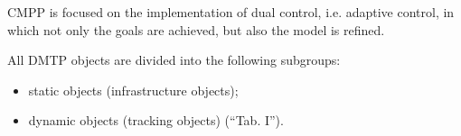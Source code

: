 \documentclass{article}
\begin{document}
\begin{multicols}{2}
CMPP is focused on the implementation of dual control, i.e. adaptive control, in which not only the goals are
achieved, but also the model is refined.

 All DMTP objects are divided into the following subgroups:
 \begin{itemize}
    \item static objects (infrastructure objects);
    \item dynamic objects (tracking objects) (“Tab. I”).
\end{itemize}



\end{multicols}
\end{document}
